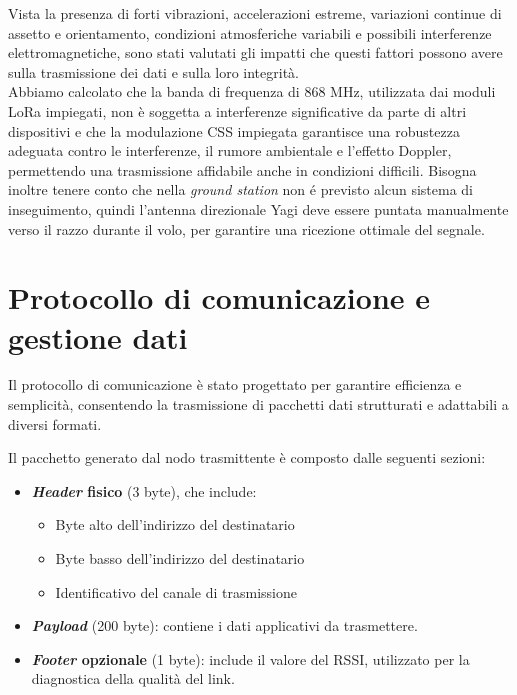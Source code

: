\documentclass[12pt,a4paper,twoside]{book}
\begin{document}
Vista la presenza di forti vibrazioni, accelerazioni estreme,
variazioni continue di assetto e orientamento, condizioni atmosferiche variabili
e possibili interferenze elettromagnetiche, sono stati valutati
gli impatti che questi fattori possono avere sulla trasmissione dei dati e sulla
loro integrità. \\
Abbiamo calcolato che la banda di frequenza di 868 MHz, utilizzata dai moduli
\ac{LoRa} impiegati, non è soggetta a interferenze significative da parte di altri
dispositivi e che la modulazione \ac{CSS} impiegata garantisce una robustezza
adeguata contro le interferenze, il rumore ambientale e l'effetto Doppler,
permettendo una trasmissione affidabile anche in condizioni difficili.
Bisogna inoltre tenere conto che nella \emph{ground station} non \'e previsto
alcun sistema di inseguimento, quindi l'antenna direzionale Yagi deve essere puntata manualmente
verso il razzo durante il volo, per garantire una ricezione ottimale del segnale.

\section{Protocollo di comunicazione e gestione dati}

Il protocollo di comunicazione è stato progettato per garantire efficienza e
semplicità, consentendo la trasmissione di pacchetti dati strutturati e adattabili
a diversi formati.

Il pacchetto generato dal nodo trasmittente è composto dalle seguenti sezioni:

\begin{itemize}
    \item \textbf{\emph{Header} fisico} (3 byte), che include:
          \begin{itemize}
              \item Byte alto dell’indirizzo del destinatario
              \item Byte basso dell’indirizzo del destinatario
              \item Identificativo del canale di trasmissione
          \end{itemize}
    \item \textbf{\emph{Payload}} (200 byte): contiene i dati applicativi da trasmettere.

    \item \textbf{\emph{Footer} opzionale} (1 byte): include il valore del \ac{RSSI},
          utilizzato per la diagnostica della qualità del link.
\end{itemize}
\end{document}
